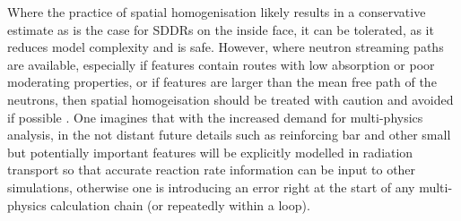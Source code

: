 Where the practice of spatial homogenisation likely results in a conservative estimate as is the case for SDDRs on the inside face, it can be tolerated, as it reduces model complexity and is safe. However, where neutron streaming paths are available, especially if features contain routes with low absorption or poor moderating properties, or if features are larger than the mean free path of the neutrons, then spatial homogeisation should be treated with caution and avoided if possible \cite{Pampin2007}. One imagines that with the increased demand for multi-physics analysis, in the not distant future details such as reinforcing bar and other small but potentially important features will be explicitly modelled in radiation transport so that accurate reaction rate information can be input to other simulations, otherwise one is introducing an error right at the start of any multi-physics calculation chain (or repeatedly within a loop).


